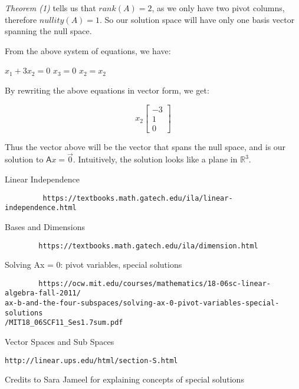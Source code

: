 \documentclass[a4paper, 11pt]{article}
\newcommand{\mat}[1]{\boldsymbol { \mathsf{#1}} }
\begin{document}
\begin{enumerate}
\textit{Theorem (1)} tells us that $rank(A) = 2$, as we only have two pivot columns, therefore $nullity(A) = 1$. So our solution space will have only one basis vector spanning the null space.

From the above system of equations, we have:

\begin{center}
	$x_1 + 3x_2 = 0$
	$x_3 = 0$
	$x_2 = x_2$
\end{center}

By rewriting the above equations in vector form, we get:

\begin{equation*}
	x_2 \begin{bmatrix}
	-3 \\
	1 \\
	0 \
	\end{bmatrix}
\end{equation*}

	Thus the vector above will be the vector that spans the null space, and is our solution to $\mat{A}x = \vec{0}$. Intuitively, the solution looks like a plane in $\mathds{R}^3$.

\end{enumerate}

\newpage 

\begin{thebibliography}{}
		Linear Independence 
		\begin{verbatim}
		 https://textbooks.math.gatech.edu/ila/linear-independence.html
		\end{verbatim}
		Bases and Dimensions
		\begin{verbatim}
		https://textbooks.math.gatech.edu/ila/dimension.html	
		\end{verbatim}
		Solving Ax = 0: pivot variables, special solutions
		\begin{verbatim}
		https://ocw.mit.edu/courses/mathematics/18-06sc-linear-algebra-fall-2011/
ax-b-and-the-four-subspaces/solving-ax-0-pivot-variables-special-solutions
/MIT18_06SCF11_Ses1.7sum.pdf
        \end{verbatim}
    Vector Spaces and Sub Spaces
        \begin{verbatim}
http://linear.ups.edu/html/section-S.html
		\end{verbatim}
		
		Credits to Sara Jameel for explaining concepts of special solutions 

\end{thebibliography}
\end{document}
